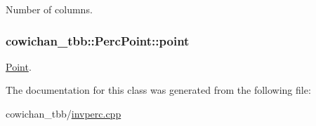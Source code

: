 Number of columns. \hypertarget{classcowichan__tbb_1_1_perc_point_42029c309350f2f2768c33ef608c24cd}{
\subsubsection[{point}]{ {\bf cowichan\_\-tbb::PercPoint::point}}}
\label{classcowichan__tbb_1_1_perc_point_42029c309350f2f2768c33ef608c24cd}


\hyperlink{class_point}{Point}. 

The documentation for this class was generated from the following file:\begin{CompactItemize}
\item 
cowichan\_\-tbb/\hyperlink{cowichan__tbb_2invperc_8cpp}{invperc.cpp}\end{CompactItemize}
